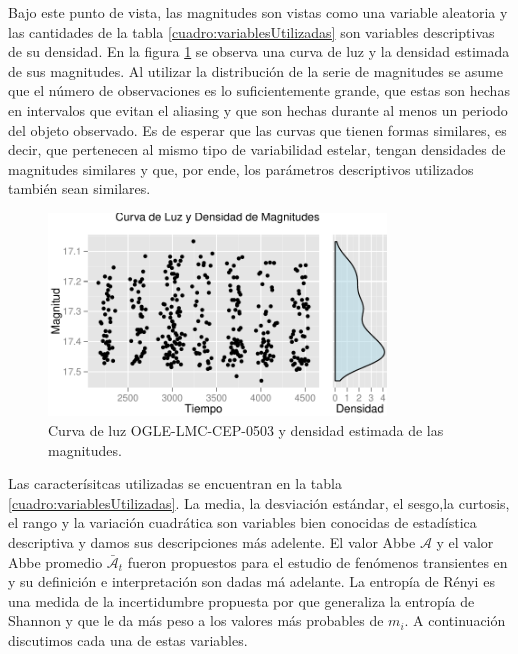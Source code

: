 \documentclass[letterpaper,12pt]{book}
\begin{document}
Bajo este punto de vista, las magnitudes son vistas como una variable aleatoria y las cantidades de la tabla \ref{cuadro:variablesUtilizadas} son variables descriptivas de su densidad. En la figura \ref{fig:curvaHist} se observa una curva de luz y la densidad estimada de sus magnitudes. Al utilizar la distribución de la serie de magnitudes se asume que el número de observaciones es lo suficientemente grande, que estas son hechas en intervalos que evitan el aliasing y que son hechas durante al menos un periodo del objeto observado. Es de esperar que las curvas que tienen formas similares, es decir, que pertenecen al mismo tipo de variabilidad estelar, tengan densidades de magnitudes similares y que, por ende, los parámetros descriptivos utilizados también sean similares.


\begin{figure}
  \centering
  \includegraphics[width = 0.8\textwidth]{./img/CClasificacion/curvaHist.pdf}
  \caption{Curva de luz OGLE-LMC-CEP-0503 y densidad estimada de las magnitudes. }
  \label{fig:curvaHist}
  \centering
\end{figure}

Las caracterísitcas utilizadas se encuentran en la tabla  \ref{cuadro:variablesUtilizadas}. La media, la desviación estándar, el sesgo,la curtosis, el rango y la variación cuadrática son variables bien conocidas de estadística descriptiva y damos sus descripciones más adelente. El valor Abbe $\mathcal{A}$ y el valor Abbe promedio $\bar{\mathcal{A}}_t$ fueron propuestos para el estudio de fenómenos transientes en \cite{mowlavi_searching_2014} y su definición e interpretación son dadas má adelante. La entropía de Rényi es una medida de la incertidumbre propuesta por \cite{renyi_measures_1961} que generaliza la entropía de Shannon \cite{shannon_mathematical_1948} y que le da más peso a los valores más probables de $m_i$. A continuación discutimos cada una de estas variables.
\end{document}

